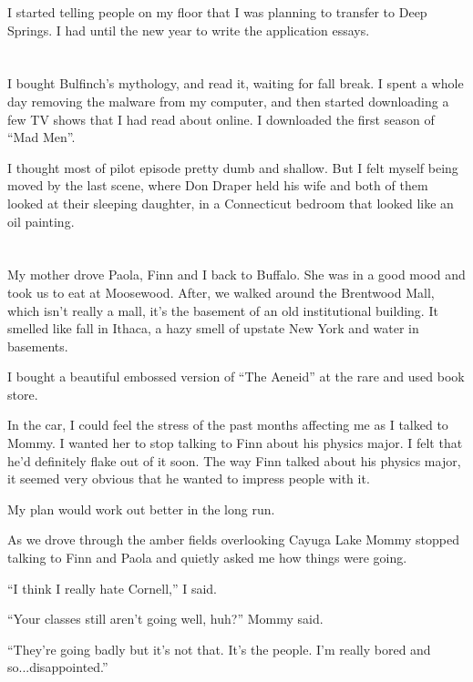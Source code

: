 I started telling people on my floor that I was planning to transfer to Deep
Springs.  I had until the new year to write the application essays.

\section{}

I bought Bulfinch's mythology, and read it, waiting for fall break.  I spent a
whole day removing the malware from my computer, and then started downloading a
few TV shows that I had read about online.  I downloaded the first season of
``Mad Men''. 

I thought most of pilot episode pretty dumb and shallow.  But I felt myself
being moved by the last scene, where Don Draper held his wife and both of them
looked at their sleeping daughter, in a Connecticut bedroom that looked like an
oil painting.

\section{}

My mother drove Paola, Finn and I back to Buffalo.  She was in a good mood and
took us to eat at Moosewood.  After, we walked around the Brentwood Mall, which
isn't really a mall, it's the basement of an old institutional building.  It
smelled like fall in Ithaca, a hazy smell of upstate New York and water in
basements. 

I bought a beautiful embossed version of ``The Aeneid'' at the rare and used book
store. 

In the car, I could feel the stress of the past months affecting me as I talked
to Mommy. I wanted her to stop talking to Finn about his physics major.  I felt
that he'd definitely flake out of it soon.  The way Finn talked about his
physics major, it seemed very obvious that he wanted to impress people with it. 

My plan would work out better in the long run.

As we drove through the amber fields overlooking Cayuga Lake Mommy stopped
talking to Finn and Paola and quietly asked me how things were going.

``I think I really hate Cornell,'' I said.

``Your classes still aren't going well, huh?'' Mommy said. 

``They're going badly but it's not that.  It's the people.  I'm really bored and
so...disappointed.''

